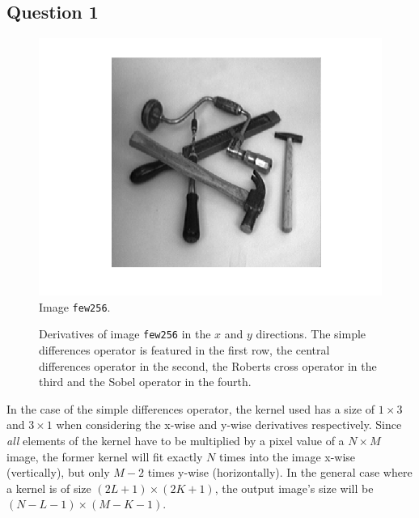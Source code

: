 \subsection{Question 1}

\begin{figure}[H]
	\centering
	\includegraphics[scale=0.8]{./images/Q1/tools.png}
	\caption{Image \texttt{few256}.}
	\label{fig:Q1:tools}
\end{figure}


\begin{figure}
	\centering
	\scalebox{0.9}{}
	\caption{Derivatives of image \texttt{few256} in the $x$ and $y$ directions. The simple differences operator is featured in the first row,
	the central differences operator in the second, the Roberts cross operator in the third and the Sobel operator in the fourth.}
	\label{fig:Q1:derivatives}
\end{figure}


In the case of the simple differences operator, the kernel used has a size of $1 \times 3$ and $3 \times 1$ when considering the x-wise and y-wise 
derivatives respectively. Since \textit{all} elements of the kernel have to be multiplied by a pixel value of a $N \times M$ image,
the former kernel will fit exactly $N$ times into the image x-wise (vertically), but only $M-2$ times y-wise (horizontally). In the general case where
a kernel is of size $(2L+1) \times (2K+1)$, the output image's size will be $(N-L-1) \times (M-K-1)$.


